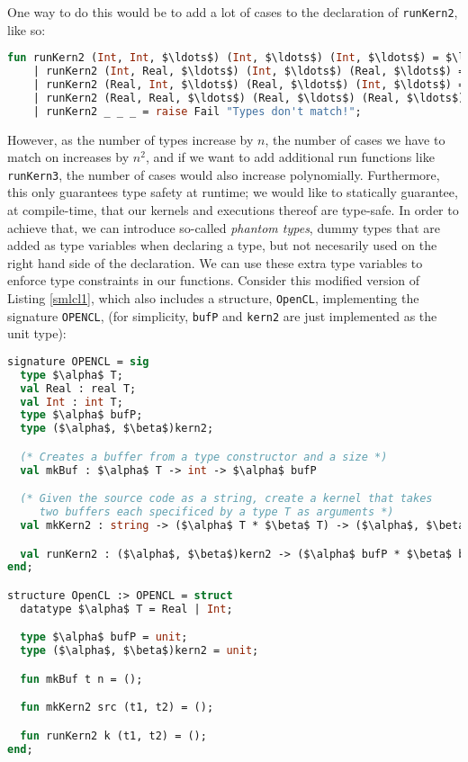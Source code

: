 One way to do this would be to add a lot of cases to the declaration
of \texttt{runKern2}, like so:

\begin{lstlisting}[language=ML, caption=Casing on runKern2,
    label=runKern,mathescape]
  fun runKern2 (Int, Int, $\ldots$) (Int, $\ldots$) (Int, $\ldots$) = $\ldots$
    | runKern2 (Int, Real, $\ldots$) (Int, $\ldots$) (Real, $\ldots$) = $\ldots$
    | runKern2 (Real, Int, $\ldots$) (Real, $\ldots$) (Int, $\ldots$) = $\ldots$
    | runKern2 (Real, Real, $\ldots$) (Real, $\ldots$) (Real, $\ldots$) = $\ldots$
    | runKern2 _ _ _ = raise Fail "Types don't match!";
\end{lstlisting}

However, as the number of types increase by $n$, the number of cases
we have to match on increases by $n^2$, and if we want to add
additional run functions like \texttt{runKern3}, the number of cases
would also increase polynomially. Furthermore, this only guarantees
type safety at runtime; we would like to statically guarantee, at
compile-time, that our kernels and executions thereof are
type-safe. In order to achieve that, we can introduce so-called
\emph{phantom types}, dummy types that are added as type variables
when declaring a type, but not necesarily used on the right hand side
of the declaration. We can use these extra type variables to enforce
type constraints in our functions. Consider this modified version of
Listing \ref{smlcl1}, which also includes a structure,
\texttt{OpenCL}, implementing the signature \texttt{OPENCL}, (for
simplicity, \texttt{bufP} and \texttt{kern2} are just implemented as
the unit type):

\begin{lstlisting}[language=ML, caption=Adding type
    variables,label=smlcl2,mathescape]
signature OPENCL = sig
  type $\alpha$ T;
  val Real : real T;
  val Int : int T;
  type $\alpha$ bufP;
  type ($\alpha$, $\beta$)kern2;

  (* Creates a buffer from a type constructor and a size *)
  val mkBuf : $\alpha$ T -> int -> $\alpha$ bufP

  (* Given the source code as a string, create a kernel that takes
     two buffers each specificed by a type T as arguments *)
  val mkKern2 : string -> ($\alpha$ T * $\beta$ T) -> ($\alpha$, $\beta$)kern2

  val runKern2 : ($\alpha$, $\beta$)kern2 -> ($\alpha$ bufP * $\beta$ bufP) -> unit
end;

structure OpenCL :> OPENCL = struct
  datatype $\alpha$ T = Real | Int;

  type $\alpha$ bufP = unit;
  type ($\alpha$, $\beta$)kern2 = unit;

  fun mkBuf t n = ();

  fun mkKern2 src (t1, t2) = ();

  fun runKern2 k (t1, t2) = ();
end;
\end{lstlisting}

